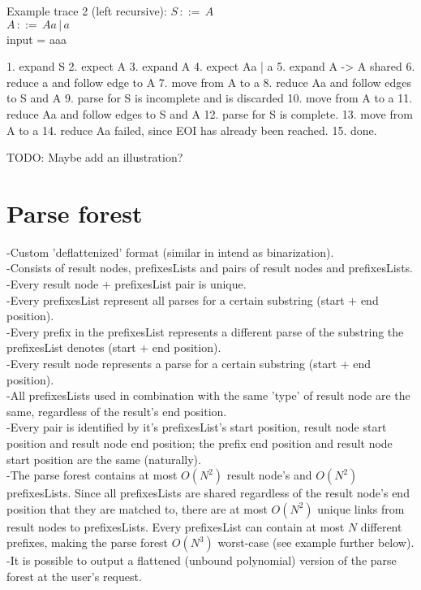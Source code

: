 \documentclass[a4paper,10pt]{article}
\begin{document}
Example trace 2 (left recursive):
$S\,::=\,A$\\
$A\,::=\,Aa\,|\,a$\\
input = aaa

1. expand S
2. expect A
3. expand A
4. expect Aa | a
5. expand A -> A shared
6. reduce a and follow edge to A
7. move from A to a
8. reduce Aa and follow edges to S and A
9. parse for S is incomplete and is discarded
10. move from A to a
11. reduce Aa and follow edges to S and A
12. parse for S is complete.
13. move from A to a
14. reduce Aa failed, since EOI has already been reached.
15. done.

TODO: Maybe add an illustration?\\

\section{Parse forest}

-Custom 'deflattenized' format (similar in intend as binarization).\\
-Consists of result nodes, prefixesLists and pairs of result nodes and prefixesLists.\\
-Every result node + prefixesList pair is unique.\\
-Every prefixesList represent all parses for a certain substring (start + end position).\\
-Every prefix in the prefixesList represents a different parse of the substring the prefixesList denotes (start + end position).\\
-Every result node represents a parse for a certain substring (start + end position).\\
-All prefixesLists used in combination with the same 'type' of result node are the same, regardless of the result's end position.\\
-Every pair is identified by it's prefixesList's start position, result node start position and result node end position; the prefix end position and result node start position are the same (naturally).\\
-The parse forest contains at most $O(N^{2})$ result node's and $O(N^{2})$ prefixesLists. Since all prefixesLists are shared regardless of the result node's end position that they are matched to, there are at most $O(N^{2})$ unique links from result nodes to prefixesLists. Every prefixesList can contain at most $N$ different prefixes, making the parse forest $O(N^{3})$ worst-case (see example further below).\\
-It is possible to output a flattened (unbound polynomial) version of the parse forest at the user's request.\\
\end{document}
